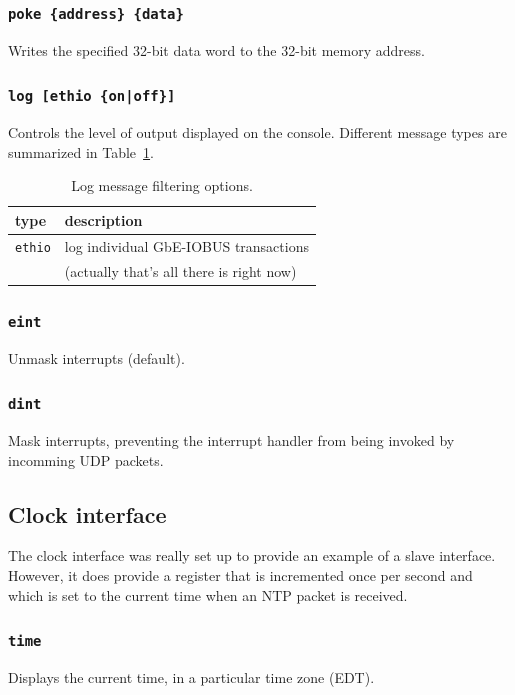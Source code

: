 \documentclass[11pt]{article}
\begin{document}
\subsubsection{\tt poke \{address\} \{data\}}
Writes the specified 32-bit data word to the 32-bit memory address.

\subsubsection{\tt log [ethio \{on|off\}]}
Controls the level of output displayed on the console.  Different
message types are summarized in Table~\ref{tab-log}.

\begin{table}
\begin{center}
\begin{tabular}{|l|l|} \hline
type & description \\ \hline
{\tt ethio} & log individual GbE-IOBUS transactions \\
 & (actually that's all there is right now) \\ \hline
\end{tabular}
\caption{\label{tab-log}Log message filtering options.}
\end{center}
\end{table}

\subsubsection{\tt eint}
Unmask interrupts (default).

\subsubsection{\tt dint}
Mask interrupts, preventing the interrupt handler from being invoked by
incomming UDP packets.

\subsection{Clock interface}
The clock interface was really set up to provide an example of a slave interface.
However, it does provide a register that is incremented once per second and which
is set to the current time when an NTP packet is received.

\subsubsection{\tt time}
Displays the current time, in a particular time zone (EDT).
\end{document}
